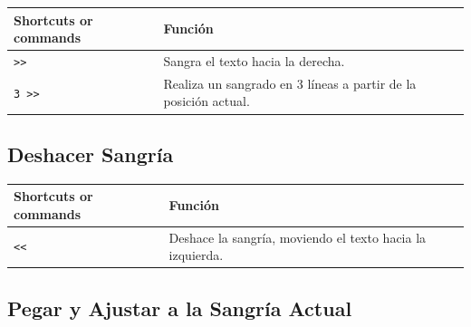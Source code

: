 \documentclass[
  doc,
  floatsintext,
  longtable,
  a4paper,
  nolmodern,
  notxfonts,
  notimes,
  12pt,
  colorlinks=true,linkcolor=blue,citecolor=blue,urlcolor=blue]{apa7}
\newcounter{none} %
\begin{document}
{\def\LTcaptype{none} %
\begin{longtable}[]{@{}
  >{\raggedright\arraybackslash}p{}
  >{\raggedright\arraybackslash}p{}@{}}
\toprule\noalign{}
\begin{minipage}[b]{\linewidth}\raggedright
Shortcuts or commands
\end{minipage} & \begin{minipage}[b]{\linewidth}\raggedright
Función
\end{minipage} \\
\midrule\noalign{}
\endhead
\bottomrule\noalign{}
\endlastfoot
\texttt{\textgreater{}\textgreater{}} & Sangra el texto hacia la
derecha. \\
\texttt{3\ \textgreater{}\textgreater{}} & Realiza un sangrado en 3
líneas a partir de la posición actual. \\
\end{longtable}
}

\subsection{Deshacer Sangría}\label{deshacer-sangruxeda}

{\def\LTcaptype{none} %
\begin{longtable}[]{@{}
  >{\raggedright\arraybackslash}p{}
  >{\raggedright\arraybackslash}p{}@{}}
\toprule\noalign{}
\begin{minipage}[b]{\linewidth}\raggedright
Shortcuts or commands
\end{minipage} & \begin{minipage}[b]{\linewidth}\raggedright
Función
\end{minipage} \\
\midrule\noalign{}
\endhead
\bottomrule\noalign{}
\endlastfoot
\texttt{\textless{}\textless{}} & Deshace la sangría, moviendo el texto
hacia la izquierda. \\
\end{longtable}
}

\subsection{Pegar y Ajustar a la Sangría
Actual}\label{pegar-y-ajustar-a-la-sangruxeda-actual}
\end{document}
